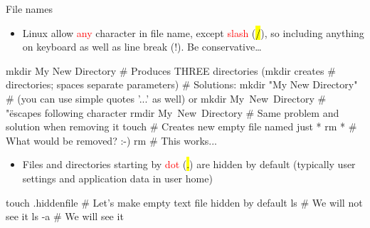 \documentclass[compress, ucs, xelatex, 11pt, xcolor=svgnames,
  hyperref={
    bookmarks=true,
    unicode=true,
    colorlinks=true,
    pdftitle={Linux, command line and MetaCentrum},
    plainpages=false,
    pdfauthor={Vojtech Zeisek},
    pdfsubject={Course about use of Linux command line, writing shell scripts and using MetaCentrum of CESNET},
    pdfcreator={XeLaTeX},
    pdfkeywords={Linux, GNU, BASH, shell, command line, MetaCentrum},
    linkcolor=DarkRed,
    anchorcolor=DarkBlue,
    citecolor=Indigo,
    filecolor=NavyBlue,
    menucolor=DarkMagenta,
    urlcolor=DarkBlue,
    pdftex},
  url={hyphens, lowtilde} %
  ]{beamer}
\renewcommand{\texttt}[1]{\hl{\ttfamily #1}}
\renewcommand{\alert}[1]{\textcolor{red}{#1}}
\begin{document}
\begin{frame}[fragile]{File names}
\begin{itemize}
  \item Linux allow \alert{any} character in file name, except \alert{slash} (\texttt{/}), so including anything on keyboard as well as line break (!). Be conservative\ldots
\end{itemize}
  \begin{bashcode}
    mkdir My New Directory # Produces THREE directories (mkdir creates
                           # directories; spaces separate parameters)
                           # Solutions:
    mkdir "My New Directory" # (you can use simple quotes '...' as well) or
    mkdir My\ New\ Directory # "\" escapes following character
    rmdir My\ New\ Directory # Same problem and solution when removing it
    touch \* # Creates new empty file named just *
    rm * # What would be removed? :-)
    rm \* # This works...
  \end{bashcode}
\begin{itemize}
  \item Files and directories starting by \alert{dot} (\texttt{.}) are hidden by default (typically user settings and application data in user home)
\end{itemize}
  \begin{bashcode}
    touch .hiddenfile # Let's make empty text file hidden by default
    ls # We will not see it
    ls -a # We will see it
  \end{bashcode}
\end{frame}
\end{document}
